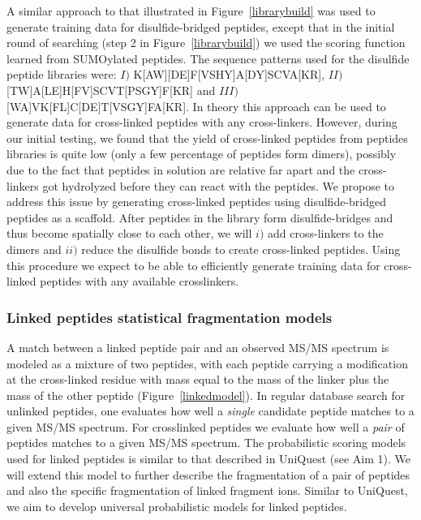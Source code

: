 \documentclass[arial,11pt]{article}
\begin{document}
A similar approach to that illustrated in Figure~\ref{librarybuild} was used to generate training data for disulfide-bridged peptides, except that in the initial round of searching (step 2 in Figure~\ref{librarybuild}) we used the scoring function learned from SUMOylated peptides. The sequence patterns used for the disulfide peptide libraries were: $I)$ \mbox{K[AW][DE]F[VSHY]A[DY]SCVA[KR]}, $II)$ \mbox{[TW]A[LE]H[FV]SCVT[PSGY]F[KR]} and
$III)$ \mbox{[WA]VK[FL]C[DE]T[VSGY]FA[KR]}. In theory this approach can be used to generate data for cross-linked peptides with any cross-linkers. However, during our initial testing, we found that the yield of cross-linked peptides from peptides libraries is quite low (only a few percentage of peptides form dimers), possibly due to the fact that peptides in solution are relative far apart and the cross-linkers got hydrolyzed before they can react with the peptides.  We propose to address this issue by generating cross-linked peptides using disulfide-bridged peptides as a scaffold. After peptides in the library form disulfide-bridges and thus become spatially close to each other, we will $i)$ add cross-linkers to the dimers and $ii)$ reduce the disulfide bonds to create cross-linked peptides. Using this procedure we expect to be able to efficiently generate training data for cross-linked peptides with any available crosslinkers.


\subsubsection{Linked peptides statistical fragmentation models}

A match between a linked peptide pair and an observed MS/MS spectrum is modeled as a mixture of two peptides, with each peptide carrying a modification at the cross-linked residue with mass equal to the mass of the linker plus the mass of the other peptide (Figure~\ref{linkedmodel}). In regular database search for unlinked peptides, one evaluates how well a \emph{single} candidate peptide matches to a given MS/MS spectrum. For crosslinked peptides we evaluate how well a \emph{pair} of peptides matches to a given MS/MS spectrum.  The probabilistic scoring models used for linked peptides is similar to that described in UniQuest (see Aim 1).  We will extend this model to further describe the fragmentation of a pair of peptides and also the specific fragmentation of linked fragment ions. Similar to UniQuest, we aim to develop universal probabilistic models for linked peptides.
\end{document}
